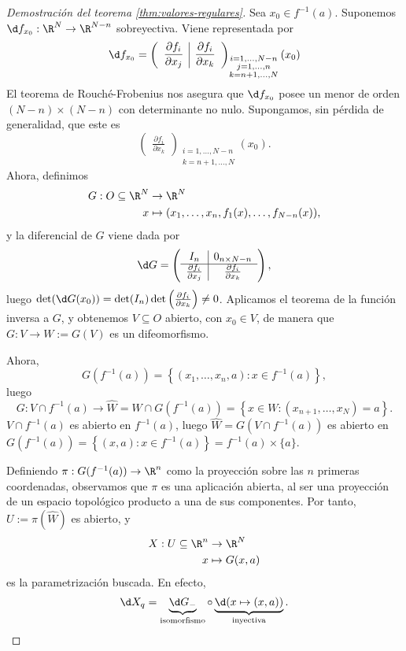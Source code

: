 \begin{proof}[Demostración del teorema \ref{thm:valores-regulares}]
  Sea $x_{0}\in f^{-1}(a)$. Suponemos $\d f_{x_{0}}: \R^{N}\to \R^{N-n}$
sobreyectiva. Viene representada por
  \[
    \d f_{x_{0}} = \left(
      \begin{array}{c|c}
        \displaystyle\frac{\partial f_{i}}{\partial x_{j}} & \displaystyle\frac{\partial f_{i}}{\partial x_{k}}
      \end{array}
\right)_{\substack{i=1,\dots,N-n \\ j=1,\dots,n \\ k=n+1,\dots,N}}(x_{0})
  \]
El teorema de Rouché-Frobenius nos asegura que $\d f_{x_{0}}$ posee un menor de
orden $(N-n)\times (N-n)$ con determinante no nulo. Supongamos, sin pérdida de
generalidad, que este es
\[
  \begin{pmatrix}
    \displaystyle \frac{\partial f_{i}}{\partial x_{k}}
  \end{pmatrix}_{\substack{i=1,\dots,N-n \\ k=n+1,\dots,N}}(x_{0})
.\]
Ahora, definimos
\begin{alignat*}{2}
    G: O \subseteq \R^{N} & \to \R^{N} \\
    x & \mapsto  (x_{1}, \dots, x_{n}, f_{1}(x), \dots, f_{N-n}(x)),
\end{alignat*}
y la diferencial de $G$ viene dada por
\[
  \d G = \left(
    \begin{array}{c|c}
      I_{n} & 0_{n\times N-n} \\ \hline
      \frac{\partial f_{i}}{\partial x_{j}} & \frac{\partial f_{i}}{\partial x_{k}}
    \end{array}
\right)
,\]
luego $\det(\d G(x_{0})) = \det(I_{n})\det\left(\frac{\partial f_{i}}{\partial
x_{k}}\right) \ne 0$. Aplicamos el teorema de la función inversa a $G$, y
obtenemos $V\subseteq O$ abierto, con $x_{0}\in V$, de manera que $G: V \to W :=
G(V)$ es un difeomorfismo.

Ahora,
\[
  G(f^{-1}(a)) = \left\{ (x_{1}, \dots, x_{n}, a) : x\in f^{-1}(a) \right\}
,\]
luego
\[
  G: V\cap f^{-1}(a)\to \hat{W} = W\cap G(f^{-1}(a)) = \left\{ x\in W : (x_{n+1}, \dots, x_{N}) = a \right\}
.\]
$V\cap f^{-1}(a)$ es abierto en $f^{-1}(a)$, luego $\hat{W} = G(V\cap
f^{-1}(a))$ es abierto en $G(f^{-1}(a)) = \left\{ (x,a) : x\in f^{-1}(a)
\right\} = f^{-1}(a)\times \{a\}$.

Definiendo $\pi: G(f^{-1}(a)) \to \R^{n}$ como la proyección sobre las $n$
primeras coordenadas, observamos que $\pi$ es una aplicación abierta, al ser una
proyección de un espacio topológico producto a una de sus componentes. Por
tanto, $U := \pi(\hat{W})$ es abierto, y
\begin{alignat*}{2}
    X: U \subseteq \R^{n} & \to \R^{N} \\
    x & \mapsto G(x,a)
\end{alignat*}
es la parametrización buscada. En efecto,
\[
  \d X_{q} = \underbrace{\d G_{-}}_{\text{isomorfismo}}\circ \underbrace{\d(x\mapsto (x,a))}_{\text{inyectiva}}
.\]
\end{proof}

